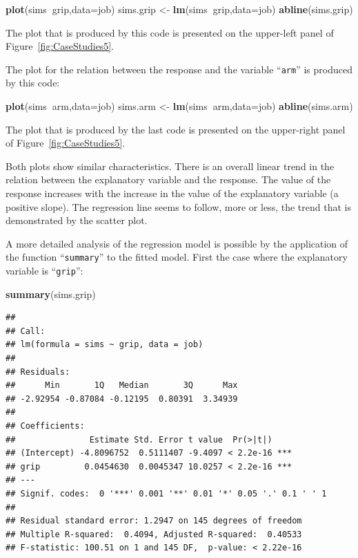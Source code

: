 \documentclass[]{krantz}
\makeatletter
\newenvironment{Shaded}{\begin{snugshade}}{\end{snugshade}}
\newcommand{\KeywordTok}[1]{\textcolor[rgb]{0.13,0.29,0.53}{\textbf{#1}}}
\newcommand{\DataTypeTok}[1]{\textcolor[rgb]{0.13,0.29,0.53}{#1}}
\newcommand{\StringTok}[1]{\textcolor[rgb]{0.31,0.60,0.02}{#1}}
\newcommand{\OperatorTok}[1]{\textcolor[rgb]{0.81,0.36,0.00}{\textbf{#1}}}
\newcommand{\NormalTok}[1]{#1}
\newenvironment{kframe}{%
\medskip{}
\setlength{\fboxsep}{.8em}
 \def\at@end@of@kframe{}%
 \ifinner\ifhmode%
  \def\at@end@of@kframe{\end{minipage}}%
  \begin{minipage}{\columnwidth}%
 \fi\fi%
 \def\FrameCommand##1{\hskip\@totalleftmargin \hskip-\fboxsep
 \colorbox{shadecolor}{##1}\hskip-\fboxsep
     \hskip-\linewidth \hskip-\@totalleftmargin \hskip\columnwidth}%
 \MakeFramed {\advance\hsize-\width
   \@totalleftmargin\z@ \linewidth\hsize
   \@setminipage}}%
 {\par\unskip\endMakeFramed%
 \at@end@of@kframe}
\renewenvironment{Shaded}{\begin{kframe}}{\end{kframe}}
\theoremstyle{definition}
\theoremstyle{definition}
\theoremstyle{definition}
\theoremstyle{remark}
\makeatother
\begin{document}
\begin{Shaded}
\begin{Highlighting}[]
\KeywordTok{plot}\NormalTok{(sims}\OperatorTok{~}\NormalTok{grip,}\DataTypeTok{data=}\NormalTok{job)}
\NormalTok{sims.grip <-}\StringTok{ }\KeywordTok{lm}\NormalTok{(sims}\OperatorTok{~}\NormalTok{grip,}\DataTypeTok{data=}\NormalTok{job)}
\KeywordTok{abline}\NormalTok{(sims.grip)}
\end{Highlighting}
\end{Shaded}

The plot that is produced by this code is presented on the upper-left
panel of Figure~\ref{fig:CaseStudies5}.

The plot for the relation between the response and the variable
``\texttt{arm}'' is produced by this code:

\begin{Shaded}
\begin{Highlighting}[]
\KeywordTok{plot}\NormalTok{(sims}\OperatorTok{~}\NormalTok{arm,}\DataTypeTok{data=}\NormalTok{job)}
\NormalTok{sims.arm <-}\StringTok{ }\KeywordTok{lm}\NormalTok{(sims}\OperatorTok{~}\NormalTok{arm,}\DataTypeTok{data=}\NormalTok{job)}
\KeywordTok{abline}\NormalTok{(sims.arm)}
\end{Highlighting}
\end{Shaded}

The plot that is produced by the last code is presented on the
upper-right panel of Figure~\ref{fig:CaseStudies5}.

Both plots show similar characteristics. There is an overall linear
trend in the relation between the explanatory variable and the response.
The value of the response increases with the increase in the value of
the explanatory variable (a positive slope). The regression line seems
to follow, more or less, the trend that is demonstrated by the scatter
plot.

A more detailed analysis of the regression model is possible by the
application of the function ``\texttt{summary}'' to the fitted model.
First the case where the explanatory variable is ``\texttt{grip}'':

\begin{Shaded}
\begin{Highlighting}[]
\KeywordTok{summary}\NormalTok{(sims.grip)}
\end{Highlighting}
\end{Shaded}

\begin{verbatim}
## 
## Call:
## lm(formula = sims ~ grip, data = job)
## 
## Residuals:
##      Min       1Q   Median       3Q      Max 
## -2.92954 -0.87084 -0.12195  0.80391  3.34939 
## 
## Coefficients:
##               Estimate Std. Error t value  Pr(>|t|)    
## (Intercept) -4.8096752  0.5111407 -9.4097 < 2.2e-16 ***
## grip         0.0454630  0.0045347 10.0257 < 2.2e-16 ***
## ---
## Signif. codes:  0 '***' 0.001 '**' 0.01 '*' 0.05 '.' 0.1 ' ' 1
## 
## Residual standard error: 1.2947 on 145 degrees of freedom
## Multiple R-squared:  0.4094, Adjusted R-squared:  0.40533 
## F-statistic: 100.51 on 1 and 145 DF,  p-value: < 2.22e-16
\end{verbatim}
\end{document}
